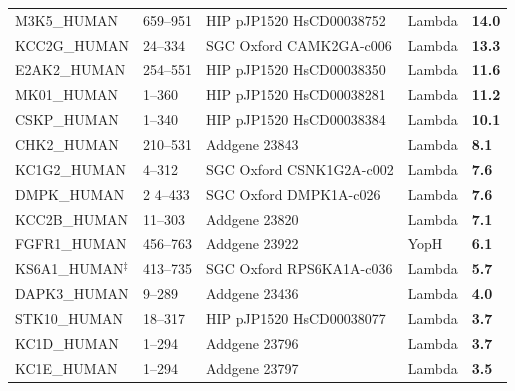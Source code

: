 \documentclass[phd,tocprelim]{cornell}
\begin{document}
\begin{landscape}
\begin{longtable}[c]{lllll}
		M3K5\_HUMAN  & 659--951 & HIP pJP1520 HsCD00038752 & Lambda                    & \cellcolor{forestgreen!55}\bf{14.0}                            \\
		KCC2G\_HUMAN & 24--334 & SGC Oxford CAMK2GA-c006 & Lambda                    & \cellcolor{forestgreen!55}\bf{13.3}                            \\
		E2AK2\_HUMAN & 254--551 & HIP pJP1520 HsCD00038350 & Lambda                    & \cellcolor{yellow!55}\bf{11.6}                            \\
		MK01\_HUMAN  & 1--360 & HIP pJP1520 HsCD00038281 & Lambda                    & \cellcolor{yellow!55}\bf{11.2}                            \\
		CSKP\_HUMAN  & 1--340 & HIP pJP1520 HsCD00038384 & Lambda                    & \cellcolor{yellow!55}\bf{10.1}                            \\
		CHK2\_HUMAN  & 210--531 & Addgene 23843 & Lambda                    & \cellcolor{yellow!55}\bf{8.1}                             \\
		KC1G2\_HUMAN & 4--312 & SGC Oxford CSNK1G2A-c002 & Lambda                    & \cellcolor{yellow!55}\bf{7.6}                             \\
		DMPK\_HUMAN  &2 4--433 & SGC Oxford DMPK1A-c026 & Lambda                    & \cellcolor{yellow!55}\bf{7.6}                             \\
		KCC2B\_HUMAN & 11--303 & Addgene 23820 & Lambda                    & \cellcolor{yellow!55}\bf{7.1}                             \\
		FGFR1\_HUMAN & 456--763 & Addgene 23922 & YopH         & \cellcolor{orange!55}\bf{6.1}                             \\
		KS6A1\_HUMAN$^\ddag$ &413--735 & SGC Oxford RPS6KA1A-c036 &   Lambda                    & \cellcolor{orange!55}\bf{5.7}                             \\
		DAPK3\_HUMAN & 9--289 & Addgene 23436 &  Lambda                    & \cellcolor{orange!55}\bf{4.0}                             \\
		STK10\_HUMAN & 18--317 & HIP pJP1520 HsCD00038077 &  Lambda                    & \cellcolor{orange!55}\bf{3.7}                             \\
		KC1D\_HUMAN  & 1--294 & Addgene 23796 & Lambda                    & \cellcolor{orange!55}\bf{3.7}                             \\
		KC1E\_HUMAN  & 1--294 & Addgene 23797 & Lambda                    & \cellcolor{orange!55}\bf{3.5}                             \\

\end{longtable}
\end{landscape}
\end{document}
